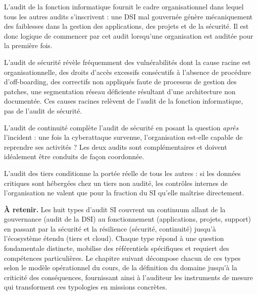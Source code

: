 L'audit de la fonction informatique fournit le cadre organisationnel dans lequel tous les autres audits s'inscrivent : une DSI mal gouvernée génère mécaniquement des faiblesses dans la gestion des applications, des projets et de la sécurité. Il est donc logique de commencer par cet audit lorsqu'une organisation est auditée pour la première fois.

L'audit de sécurité révèle fréquemment des vulnérabilités dont la cause racine est organisationnelle, des droits d'accès excessifs consécutifs à l'absence de procédure d'off-boarding, des correctifs non appliqués faute de processus de gestion des patches, une segmentation réseau déficiente résultant d'une architecture non documentée. Ces causes racines relèvent de l'audit de la fonction informatique, pas de l'audit de sécurité.

L'audit de continuité complète l'audit de sécurité en posant la question \textit{après} l'incident : une fois la cyberattaque survenue, l'organisation est-elle capable de reprendre ses activités ? Les deux audits sont complémentaires et doivent idéalement être conduits de façon coordonnée.

L'audit des tiers conditionne la portée réelle de tous les autres : si les données critiques sont hébergées chez un tiers non audité, les contrôles internes de l'organisation ne valent que pour la fraction du SI qu'elle maîtrise directement.

\begin{boxresume}
\textbf{À retenir.} Les huit types d'audit SI couvrent un continuum allant de la gouvernance (audit de la DSI) au fonctionnement (applications, projets, support) en passant par la sécurité et la résilience (sécurité, continuité) jusqu'à l'écosystème étendu (tiers et cloud). Chaque type répond à une question fondamentale distincte, mobilise des référentiels spécifiques et requiert des compétences particulières. Le chapitre suivant décompose chacun de ces types selon le modèle opérationnel du cours, de la définition du domaine jusqu'à la criticité des conséquences, fournissant ainsi à l'auditeur les instruments de mesure qui transforment ces typologies en missions concrètes.
\end{boxresume}
